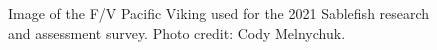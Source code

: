 \documentclass[12pt]{article}\usepackage[]{graphicx}\usepackage[]{color}
\begin{document}
\begin{figure}[htb]

{\centering {} 

}

\caption{Image of the F/V Pacific Viking used for the 2021 Sablefish research and assessment survey. Photo credit: Cody Melnychuk.}\label{fig:figure2}
\end{figure}
\clearpage
\end{document}
